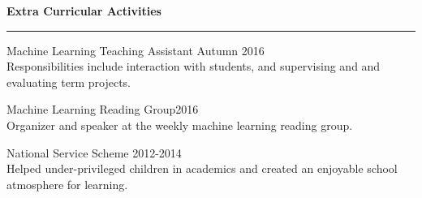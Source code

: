 \documentclass[10pt]{article}
\newcommand{\heading}[1]{
 {\large \textbf{#1}}
  \vspace{0.4em}
  \hrule
  \vspace{0.4em}
}
\newcommand{\EntryGap}{\vspace{0.5cm}}
\newcommand{\SmallEntryGap}{\vspace{0.2cm}}
\begin{document}
\EntryGap
\heading{Extra Curricular Activities}
\SmallEntryGap
Machine Learning Teaching Assistant \hfill Autumn 2016\\
Responsibilities include interaction with students, and supervising and
and evaluating term projects.

\SmallEntryGap
Machine Learning Reading Group\hfill 2016\\
Organizer and speaker at the weekly machine learning reading group.

\SmallEntryGap
National Service Scheme \hfill 2012-2014\\
Helped under-privileged children in academics and created an enjoyable school 
atmosphere for learning.
\end{document}
